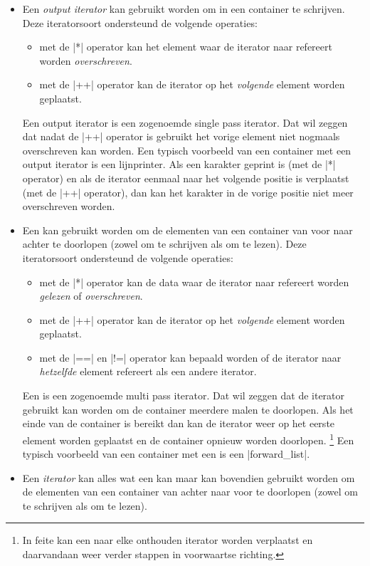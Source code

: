 \begin{cpplstShortInline}
\begin{itemize}
	\item Een \emph{output iterator} kan gebruikt worden om in een container te schrijven.
	Deze iteratorsoort ondersteund de volgende operaties:
	\begin{itemize}
		\item met de |*| operator kan het element waar de iterator naar refereert worden \emph{overschreven}.
		\item met de |++| operator kan de iterator op het \emph{volgende} element worden geplaatst.
	\end{itemize}
	Een output iterator is een zogenoemde single pass iterator.
	Dat wil zeggen dat nadat de |++| operator is gebruikt het vorige element niet nogmaals overschreven kan worden.
	Een typisch voorbeeld van een container met een output iterator is een lijnprinter.
	Als een karakter geprint is (met de |*| operator) en als de iterator eenmaal naar het volgende positie is verplaatst (met de |++| operator), dan kan het karakter in de vorige positie niet meer overschreven worden.
	\item Een \emph{} kan gebruikt worden om de elementen van een container van voor naar achter te doorlopen (zowel om te schrijven als om te lezen).
	Deze iteratorsoort ondersteund de volgende operaties:
	\begin{itemize}
		\item met de |*| operator kan de data waar de iterator naar refereert worden \emph{gelezen} of \emph{overschreven}.
		\item met de |++| operator kan de iterator op het \emph{volgende} element worden geplaatst.
		\item met de |==| en |!=| operator kan bepaald worden of de iterator naar \emph{hetzelfde} element refereert als een andere iterator.
	\end{itemize}
	Een  is een zogenoemde multi pass iterator.
	Dat wil zeggen dat de iterator gebruikt kan worden om de container meerdere malen te doorlopen.
	Als het einde van de container is bereikt dan kan de iterator weer op het eerste element worden geplaatst en de container opnieuw worden doorlopen.%
	\footnote{%
		In feite kan een  naar elke onthouden iterator worden verplaatst en daarvandaan weer verder stappen in voorwaartse richting.
	}
	Een typisch voorbeeld van een container met een  is een |forward_list|.
	\item Een \emph{ iterator} kan alles wat een  kan maar kan bovendien gebruikt worden om de elementen van een container van achter naar voor te doorlopen (zowel om te schrijven als om te lezen).

\end{itemize}
\end{cpplstShortInline}
